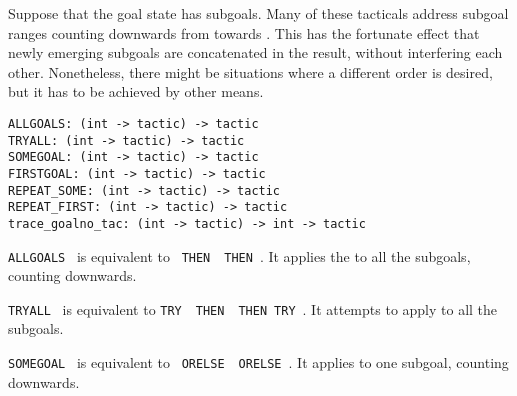 \begin{isabellebody}
\begin{isamarkuptext}
  Suppose that the goal state has  subgoals.  Many of
  these tacticals address subgoal ranges counting downwards from
   towards .  This has the fortunate effect that
  newly emerging subgoals are concatenated in the result, without
  interfering each other.  Nonetheless, there might be situations
  where a different order is desired, but it has to be achieved by
  other means.%
\end{isamarkuptext}%
\isamarkuptrue%
%
\isadelimmlref
%
\endisadelimmlref
%
\isatagmlref
%
\begin{isamarkuptext}%
\begin{mldecls}
  \verb|ALLGOALS: (int -> tactic) -> tactic| \\
  \verb|TRYALL: (int -> tactic) -> tactic| \\
  \verb|SOMEGOAL: (int -> tactic) -> tactic| \\
  \verb|FIRSTGOAL: (int -> tactic) -> tactic| \\
  \verb|REPEAT_SOME: (int -> tactic) -> tactic| \\
  \verb|REPEAT_FIRST: (int -> tactic) -> tactic| \\
  \verb|trace_goalno_tac: (int -> tactic) -> int -> tactic| \\
  \end{mldecls}

  \begin{description}

  \item \verb|ALLGOALS|~ is equivalent to ~\verb|THEN|~~\verb|THEN|~.  It
  applies the  to all the subgoals, counting downwards.

  \item \verb|TRYALL|~ is equivalent to \verb|TRY|~~\verb|THEN|~~\verb|THEN|~\verb|TRY|~.  It attempts to apply  to all the subgoals.

  \item \verb|SOMEGOAL|~ is equivalent to ~\verb|ORELSE|~~\verb|ORELSE|~.  It
  applies  to one subgoal, counting downwards.


\end{description}
\end{isamarkuptext}
\end{isabellebody}
